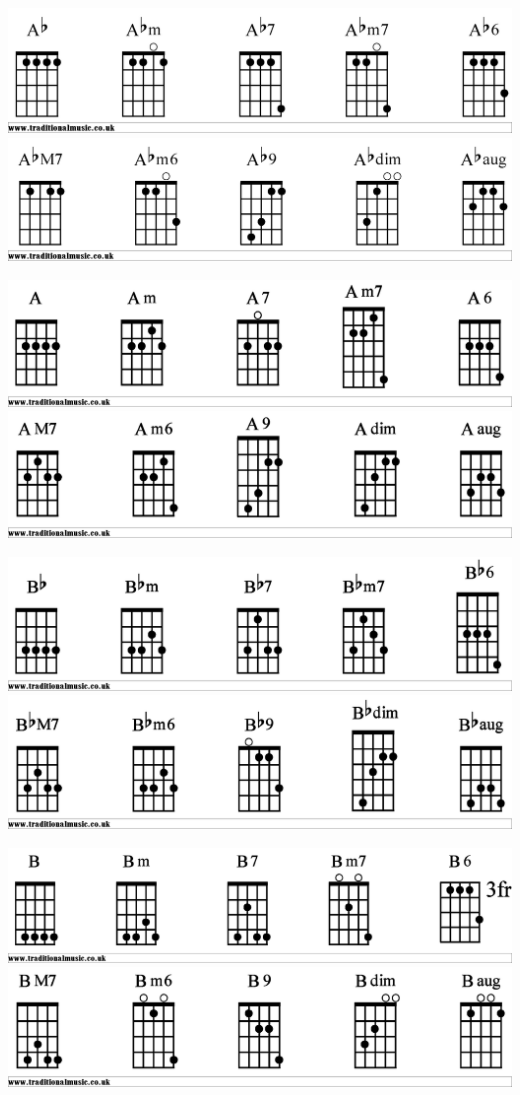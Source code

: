 

\includegraphics[scale=.15]{Abbjo1}
\includegraphics[scale=.15]{Abbjo2}

\includegraphics[scale=.15]{Abjo1}
\includegraphics[scale=.15]{Abjo2}

\includegraphics[scale=.15]{Bbbjo1}
\includegraphics[scale=.15]{Bbbjo2}

\includegraphics[scale=.15]{Bbjo1}
\includegraphics[scale=.15]{Bbjo2}

